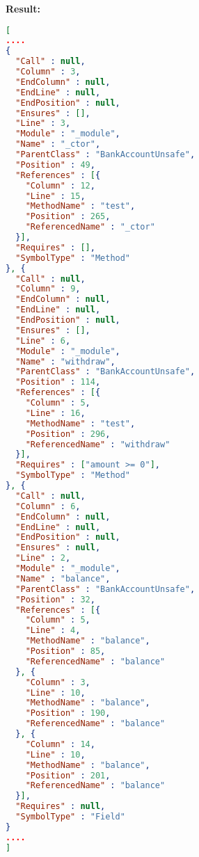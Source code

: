 \textbf{Result: }
\begin{lstlisting}[language=json,firstnumber=1]
[ 
....
{
  "Call" : null,
  "Column" : 3,
  "EndColumn" : null,
  "EndLine" : null,
  "EndPosition" : null,
  "Ensures" : [],
  "Line" : 3,
  "Module" : "_module",
  "Name" : "_ctor",
  "ParentClass" : "BankAccountUnsafe",
  "Position" : 49,
  "References" : [{
    "Column" : 12,
    "Line" : 15,
    "MethodName" : "test",
    "Position" : 265,
    "ReferencedName" : "_ctor"
  }],
  "Requires" : [],
  "SymbolType" : "Method"
}, {
  "Call" : null,
  "Column" : 9,
  "EndColumn" : null,
  "EndLine" : null,
  "EndPosition" : null,
  "Ensures" : [],
  "Line" : 6,
  "Module" : "_module",
  "Name" : "withdraw",
  "ParentClass" : "BankAccountUnsafe",
  "Position" : 114,
  "References" : [{
    "Column" : 5,
    "Line" : 16,
    "MethodName" : "test",
    "Position" : 296,
    "ReferencedName" : "withdraw"
  }],
  "Requires" : ["amount >= 0"],
  "SymbolType" : "Method"
}, {
  "Call" : null,
  "Column" : 6,
  "EndColumn" : null,
  "EndLine" : null,
  "EndPosition" : null,
  "Ensures" : null,
  "Line" : 2,
  "Module" : "_module",
  "Name" : "balance",
  "ParentClass" : "BankAccountUnsafe",
  "Position" : 32,
  "References" : [{
    "Column" : 5,
    "Line" : 4,
    "MethodName" : "balance",
    "Position" : 85,
    "ReferencedName" : "balance"
  }, {
    "Column" : 3,
    "Line" : 10,
    "MethodName" : "balance",
    "Position" : 190,
    "ReferencedName" : "balance"
  }, {
    "Column" : 14,
    "Line" : 10,
    "MethodName" : "balance",
    "Position" : 201,
    "ReferencedName" : "balance"
  }],
  "Requires" : null,
  "SymbolType" : "Field"
}
.... 
]
\end{lstlisting}



